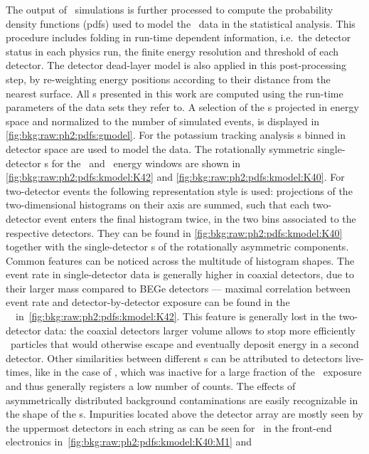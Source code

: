 The output of \mage\ simulations is further processed to compute the probability density
functions (pdfs) used to model the \gerda\ data in the statistical analysis. This
procedure includes folding in run-time dependent information, i.e.~the detector status in
each physics run, the finite energy resolution and threshold of each detector. The
detector dead-layer model is also applied in this post-processing step, by re-weighting
energy positions according to their distance from the nearest surface. All \pdf{}s presented
in this work are computed using the run-time parameters of the data sets they refer
to. A selection of the \pdf{}s projected in energy space and normalized to the number of
simulated events, is displayed in \cref{fig:bkg:raw:ph2:pdfs:gmodel}.
\newpar
For the potassium tracking analysis \pdf{}s binned in detector space are used to model the
data. The rotationally symmetric single-detector \pdf{}s for the \kvn\ and \kvz\ energy
windows are shown in \cref{fig:bkg:raw:ph2:pdfs:kmodel:K42} and
\cref{fig:bkg:raw:ph2:pdfs:kmodel:K40}. For two-detector events the following
representation style is used: projections of the two-dimensional histograms on their axis
are summed, such that each two-detector event enters the final histogram twice, in the two
bins associated to the respective detectors. They can be found in
\cref{fig:bkg:raw:ph2:pdfs:kmodel:K40} together with the single-detector \pdf{}s of the
rotationally asymmetric components.
\newpar
Common features can be noticed across the multitude of histogram shapes. The event rate in
single-detector data is generally higher in coaxial detectors, due to their larger mass
compared to BEGe detectors --- maximal correlation between event rate and
detector-by-detector exposure can be found in the \nnbb\ \pdf\
in~\cref{fig:bkg:raw:ph2:pdfs:kmodel:K42}. This feature is generally lost in the
two-detector data: the coaxial detectors larger volume allows to stop more efficiently \g\
particles that would otherwise escape and eventually deposit energy in a second detector.
Other similarities between different \pdf{}s can be attributed to detectors live-times, like
in the case of \GD{91C}, which was inactive for a large fraction of the \phasetwo\
exposure and thus generally registers a low number of counts. The effects of
asymmetrically distributed background contaminations are easily recognizable in the shape
of the \pdf{}s. Impurities located above the detector array are mostly seen by the uppermost
detectors in each string as can be seen for \kvn\ in the front-end electronics
in~\cref{fig:bkg:raw:ph2:pdfs:kmodel:K40:M1} and
